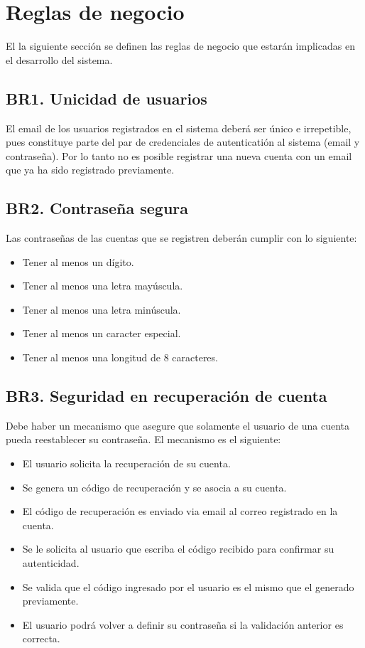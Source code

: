 
\section{Reglas de negocio}
El la siguiente sección se definen las reglas de negocio que estarán implicadas en el desarrollo del sistema.\par
\subsection{BR1. Unicidad de usuarios}
El email de los usuarios registrados en el sistema deberá ser único e irrepetible, pues constituye parte del par de credenciales de autenticatión al sistema (email y contraseña). Por lo tanto no es posible registrar una nueva cuenta con un email que ya ha sido registrado previamente.

\subsection{BR2. Contraseña segura}
Las contraseñas de las cuentas que se registren deberán cumplir con lo siguiente:
\begin{itemize}
	\item Tener al menos un dígito.
	\item Tener al menos una letra mayúscula.
	\item Tener al menos una letra minúscula.
	\item Tener al menos un caracter especial.
	\item Tener al menos una longitud de 8 caracteres.
\end{itemize}

\subsection{BR3. Seguridad en recuperación de cuenta}
Debe haber un mecanismo que asegure que solamente el usuario de una cuenta pueda reestablecer su contraseña. El mecanismo es el siguiente:
\begin{itemize}
	\item El usuario solicita la recuperación de su cuenta.
	\item Se genera un código de recuperación y se asocia a su cuenta.
	\item El código de recuperación es enviado via email al correo registrado en la cuenta.
	\item Se le solicita al usuario que escriba el código recibido para confirmar su autenticidad.
	\item Se valida que el código ingresado por el usuario es el mismo que el generado previamente.
	\item El usuario podrá volver a definir su contraseña si la validación anterior es correcta.
\end{itemize}